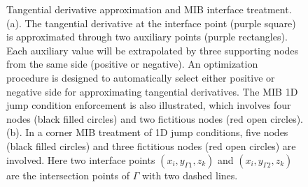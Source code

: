 \documentclass[dissertation]{uathesis}
\begin{document}
\begin{body}
%
\begin{figure}[!ht]
	\begin{center}
	\end{center}
	\caption{Tangential derivative approximation and MIB interface treatment. 
		(a). The tangential derivative at the interface point (purple square) is approximated through two auxiliary points (purple rectangles). Each auxiliary value will be extrapolated by three supporting nodes from the same side (positive or negative). An optimization procedure is designed to automatically select either positive or negative side for approximating tangential derivatives. The MIB 1D jump condition enforcement is also illustrated, which involves four nodes (black filled circles) and two fictitious nodes (red open circles). 
		(b). In a corner MIB treatment of 1D jump conditions,  five nodes (black filled circles) and three fictitious nodes (red open circles) are involved. Here two interface points $(x_i,y_{\Gamma1},z_k)$ and $(x_i,y_{\Gamma2},z_k)$ are the intersection points of $\Gamma$ with two dashed lines. }
	\label{fig:tangential_approximation}
\end{figure}
%


\end{body}
\end{document}
